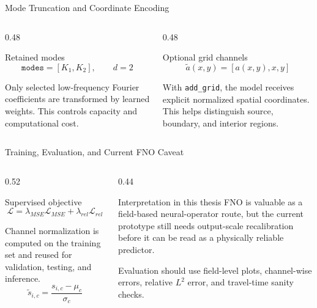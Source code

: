 \begin{frame}{Mode Truncation and Coordinate Encoding}
  \begin{columns}[T]
    \begin{column}{0.48\textwidth}
      \begin{block}{Retained modes}
        \[
          \texttt{modes}=[K_1,K_2],\qquad d=2
        \]
      \end{block}
      \footnotesize
      Only selected low-frequency Fourier coefficients are transformed by
      learned weights. This controls capacity and computational cost.
    \end{column}
    \begin{column}{0.48\textwidth}
      \begin{block}{Optional grid channels}
        \[
          \tilde{a}(x,y)=[a(x,y),x,y]
        \]
      \end{block}
      \footnotesize
      With \texttt{add\_grid}, the model receives explicit normalized spatial
      coordinates. This helps distinguish source, boundary, and interior regions.
    \end{column}
  \end{columns}
\end{frame}

\begin{frame}{Training, Evaluation, and Current FNO Caveat}
  \begin{columns}[T]
    \begin{column}{0.52\textwidth}
      \begin{block}{Supervised objective}
        \[
          \mathcal{L}=\lambda_{MSE}\mathcal{L}_{MSE}
          +\lambda_{rel}\mathcal{L}_{rel}
        \]
      \end{block}
      \scriptsize
      Channel normalization is computed on the training set and reused for
      validation, testing, and inference.
      \[
        \tilde{s}_{i,c}=\frac{s_{i,c}-\mu_c}{\sigma_c}
      \]
    \end{column}
    \begin{column}{0.44\textwidth}
      \begin{alertblock}{Interpretation in this thesis}
        \footnotesize
        FNO is valuable as a field-based neural-operator route, but the current
        prototype still needs output-scale recalibration before it can be read
        as a physically reliable predictor.
      \end{alertblock}
      \footnotesize
      Evaluation should use field-level plots, channel-wise errors, relative
      $L^2$ error, and travel-time sanity checks.
    \end{column}
  \end{columns}
\end{frame}
